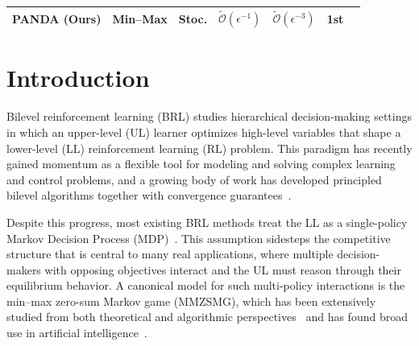 \documentclass{article}
\theoremstyle{plain}
\theoremstyle{definition}
\theoremstyle{remark}
\def\cO{\mathcal O}
\begin{document}
\begin{table}[t]
\begin{center}
\begin{small}
\begin{threeparttable}
\begin{tabular}{lcccccc}
            \midrule
            \textbf{PANDA (Ours)}
                & Min--Max & Stoc. & $\tilde{\cO}(\epsilon^{-1})$ & $\tilde{\cO}(\epsilon^{-3})$ & 1st\\
            \bottomrule
            \end{tabular}

        \end{threeparttable}
    \end{small}
  \end{center}
\vspace{-2mm}
\end{table}

\section{Introduction}
Bilevel reinforcement learning (BRL) studies hierarchical decision-making settings in which an upper-level (UL) learner optimizes high-level variables that shape a lower-level (LL) reinforcement learning (RL) problem.
This paradigm has recently gained momentum as a flexible tool for modeling and solving complex learning and control problems, and a growing body of work has developed principled bilevel algorithms together with convergence guarantees~\citep{chakraborty2024parl,thoma2024contextual,shen2025principled}.

\vspace{-1mm}
Despite this progress, most existing BRL methods treat the LL as a single-policy Markov Decision Process (MDP)~\citep{chakraborty2024parl,thoma2024contextual,gaur2025on,zeng2025regularized}. This assumption sidesteps the competitive structure that is central to many real applications, where multiple decision-makers with opposing objectives interact and the UL must reason through their equilibrium behavior. A canonical model for such multi-policy interactions is the min--max
zero-sum Markov game (MMZSMG), which has been extensively studied from both
theoretical and algorithmic perspectives~\citep{bai2020near,zeng2022regularized,cen2024fast}
and has found broad use in artificial intelligence~\citep{munos2024nash,kuba2025language}.
\end{document}
